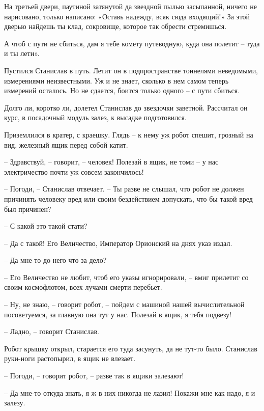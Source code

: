\documentclass[ebook,oneside,final,openright]{memoir}
\begin{document}
\par
На третьей двери, паутиной затянутой да звездной пылью засыпанной, ничего не нарисовано, только написано: «Оставь надежду, всяк сюда входящий!» За этой дверью найдешь ты клад, сокровище, которое так обрести стремишься.\par
\par
А чтоб с пути не сбиться, дам я тебе комету путеводную, куда она полетит – туда и ты лети».\par
\par
Пустился Станислав в путь. Летит он в подпространстве тоннелями неведомыми, измерениями неизвестными. Уж и не знает, сколько в нем самом теперь измерений осталось. Но не сдается, боится только одного – с пути сбиться.\par
\par
Долго ли, коротко ли, долетел Станислав до звездочки заветной. Рассчитал он курс, в посадочный модуль залез, к высадке подготовился.\par
\par
Приземлился в кратер, с краешку. Глядь – к нему уж робот спешит, грозный на вид, железный ящик перед собой катит.\par
– Здравствуй, – говорит, – человек! Полезай в ящик, не томи – у нас электричество почти уж совсем закончилось!\par
– Погоди, – Станислав отвечает. – Ты разве не слышал, что робот не должен причинять человеку вред или своим бездействием допускать, что бы такой вред был причинен?\par
– С какой это такой стати?\par
– Да с такой! Его Величество, Император Орионский на днях указ издал.\par
– Да мне-то до него что за дело?\par
– Его Величество не любит, чтоб его указы игнорировали, – вмиг прилетит со своим космофлотом, всех лучами смерти перебьет.\par
– Ну, не знаю, – говорит робот, – пойдем с машиной нашей вычислительной посоветуемся, за главную она тут у нас. Полезай в ящик, я тебя подвезу!\par
– Ладно, – говорит Станислав.\par
Робот крышку открыл, старается его туда засунуть, да не тут-то было. Станислав руки-ноги растопырил, в ящик не влезает. \par
– Погоди, – говорит робот, – разве так в ящики залезают! \par
– Да мне-то откуда знать, я ж в них никогда не лазил! Покажи мне как надо, я и залезу. \par
\end{document}
